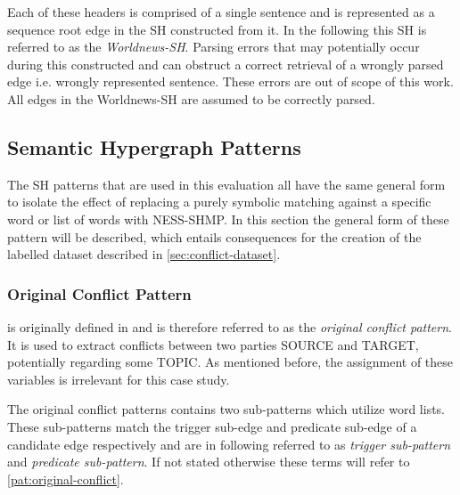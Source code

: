 \documentclass[11pt]{scrreprt}
\let\citef\cite  %
\let\cite\parencite  %
\begin{document}
Each of these headers is comprised of a single sentence and is represented as a sequence root edge in the SH constructed from it. In the following this SH is referred to as the \textit{Worldnews-SH}. Parsing errors that may potentially occur during this constructed and can obstruct a correct retrieval of a wrongly parsed edge i.e. wrongly represented sentence. These errors are out of scope of this work. All edges in the Worldnews-SH are assumed to be correctly parsed.

%


\subsection{Semantic Hypergraph Patterns}
\label{sec:sh-patterns}
The SH patterns that are used in this evaluation all have the same general form to isolate the effect of replacing a purely symbolic matching against a specific word or list of words with NESS-SHMP. In this section the general form of these pattern will be described, which entails consequences for the creation of the labelled dataset described in \cref{sec:conflict-dataset}. 



\subsubsection{Original Conflict Pattern}
 is originally defined in \citef[p.~22]{menezesSemanticHypergraphs2021} and is therefore referred to as the \textit{original conflict pattern}. It is used to extract conflicts between two parties \textsf{SOURCE} and \textsf{TARGET}, potentially regarding some \textsf{TOPIC}. As mentioned before, the assignment of these variables is irrelevant for this case study.

The original conflict patterns contains two sub-patterns which utilize word lists. These sub-patterns match the trigger sub-edge and predicate sub-edge of a candidate edge respectively and are in following referred to as \textit{trigger sub-pattern} and \textit{predicate sub-pattern}. If not stated otherwise these terms will refer to \cref{pat:original-conflict}. 
\end{document}
